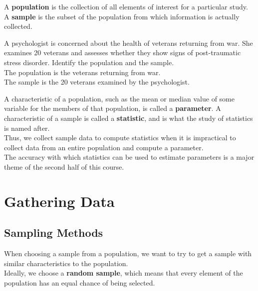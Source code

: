 \documentclass[12pt,openany]{book}
\begin{document}
	\noindent A \textbf{population} is the collection of all elements of interest for a particular study.\\

	\noindent A \textbf{sample} is the subset of the population from which information is actually collected.

	\begin{tcolorbox}[width=\textwidth,colback={green!10},title={\textbf{Example: Exercise 53}},colbacktitle={green!10},coltitle=black]
		A psychologist is concerned about the health of veterans returning from war. She examines 20 veterans and assesses whether they show signs of post-traumatic stress disorder. Identify the population and the sample.\\

		The population is the veterans returning from war.\\

		The sample is the 20 veterans examined by the psychologist.
	\end{tcolorbox}

	\noindent A characteristic of a population, such as the mean or median value of some variable for the members of that population, is called a \textbf{parameter}. A characteristic of a sample is called a \textbf{statistic}, and is what the study of statistics is named after.\\

	\noindent Thus, we collect sample data to compute statistics when it is impractical to collect data from an entire population and compute a parameter.\\

	\noindent The accuracy with which statistics can be used to estimate parameters is a major theme of the second half of this course.

	\section{Gathering Data}

	\subsection{Sampling Methods}

	\noindent When choosing a sample from a population, we want to try to get a sample with similar characteristics to the population.\\

	\noindent Ideally, we choose a \textbf{random sample}, which means that every element of the population has an equal chance of being selected.\\
\end{document}
